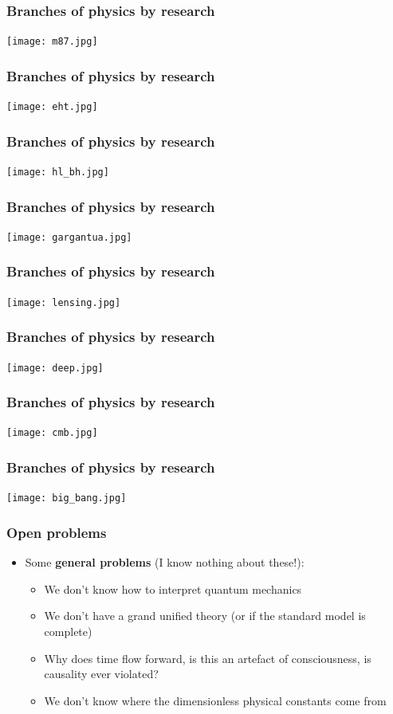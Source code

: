 \documentclass{beamer}
\begin{document}
\begin{frame}
  \center
  \frametitle{Branches of physics by research}
  \texttt{[image: m87.jpg]}
\end{frame}

\begin{frame}
  \center
  \frametitle{Branches of physics by research}
  \texttt{[image: eht.jpg]}
\end{frame}

\begin{frame}
  \center
  \frametitle{Branches of physics by research}
  \texttt{[image: hl\_bh.jpg]}
\end{frame}

\begin{frame}
  \center
  \frametitle{Branches of physics by research}
  \texttt{[image: gargantua.jpg]}
\end{frame}

\begin{frame}
  \center
  \frametitle{Branches of physics by research}
  \texttt{[image: lensing.jpg]}
\end{frame}

\begin{frame}
  \center
  \frametitle{Branches of physics by research}
  \texttt{[image: deep.jpg]}
\end{frame}

\begin{frame}
  \center
  \frametitle{Branches of physics by research}
  \texttt{[image: cmb.jpg]}
\end{frame}

\begin{frame}
  \center
  \frametitle{Branches of physics by research}
  \texttt{[image: big\_bang.jpg]}
\end{frame}

\begin{frame}
  \frametitle{Open problems}
  \begin{itemize}
    \item<1-> Some \textbf{general problems} (I know nothing about these!):
      \begin{itemize}
	\item<2-> We don't know how to interpret quantum mechanics
	\item<3-> We don't have a grand unified theory (or if the standard model is complete)
	\item<4-> Why does time flow forward, is this an artefact of consciousness, is causality ever violated?
	\item<5-> We don't know where the dimensionless physical constants come from
      \end{itemize}
  \end{itemize}
\end{frame}
\end{document}
